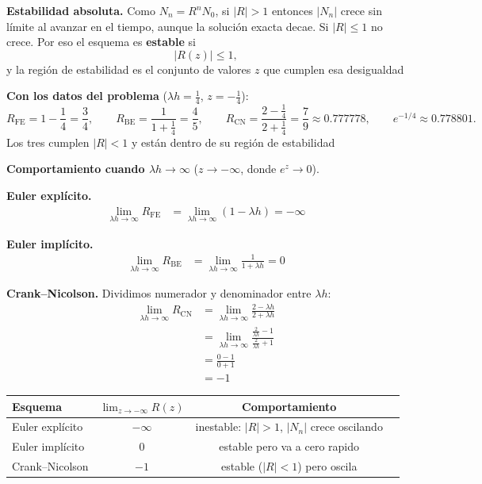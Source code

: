 \textbf{Estabilidad absoluta.} Como $N_n = R^n N_0$, si $|R| > 1$ entonces $|N_n|$ crece sin límite
al avanzar en el tiempo, aunque la solución exacta decae. Si $|R| \le 1$ no crece. Por eso el esquema es
\textbf{estable} si
\[
|R(z)| \le 1 ,
\]
y la región de estabilidad es el conjunto de valores $z$ que cumplen esa desigualdad

\textbf{Con los datos del problema} ($\lambda h = \tfrac14$, $z = -\tfrac14$):
\[
R_{\mathrm{FE}} = 1 - \frac14 = \frac34, \qquad
R_{\mathrm{BE}} = \frac{1}{1 + \frac14} = \frac45, \qquad
R_{\mathrm{CN}} = \frac{2 - \frac14}{2 + \frac14} = \frac79 \approx 0.777778, \qquad
e^{-1/4} \approx 0.778801 .
\]
Los tres cumplen $|R| < 1$ y están dentro de su región de estabilidad

\textbf{Comportamiento cuando $\lambda h \to \infty$} ($z \to -\infty$, donde $e^{z} \to 0$).

\textbf{Euler explícito.}
\begin{align*}
	\lim_{\lambda h \to \infty} R_{\mathrm{FE}} &= \lim_{\lambda h \to \infty} \left(1 - \lambda h\right) = -\infty
\end{align*}

\textbf{Euler implícito.}
\begin{align*}
	\lim_{\lambda h \to \infty} R_{\mathrm{BE}} &= \lim_{\lambda h \to \infty} \frac{1}{1 + \lambda h} = 0
\end{align*}

\textbf{Crank--Nicolson.} Dividimos numerador y denominador entre $\lambda h$:
\begin{align*}
	\lim_{\lambda h \to \infty} R_{\mathrm{CN}}
	&= \lim_{\lambda h \to \infty} \frac{2 - \lambda h}{2 + \lambda h}\\
	&= \lim_{\lambda h \to \infty} \frac{\frac{2}{\lambda h} - 1}{\frac{2}{\lambda h} + 1}\\
	&= \frac{0 - 1}{0 + 1}\\
	&= -1
\end{align*}
\begin{center}
	\begin{tabular}{lccp{7cm}}\toprule
		Esquema & $\displaystyle\lim_{z \to -\infty} R(z)$ & Comportamiento\\\midrule
		Euler explícito & $-\infty$ & inestable: $|R|>1$, $|N_n|$ crece oscilando\\
		Euler implícito & $0$       & estable pero va a cero rapido\\
		Crank--Nicolson & $-1$      & estable ($|R|<1$) pero oscila \\\bottomrule
	\end{tabular}
\end{center}

